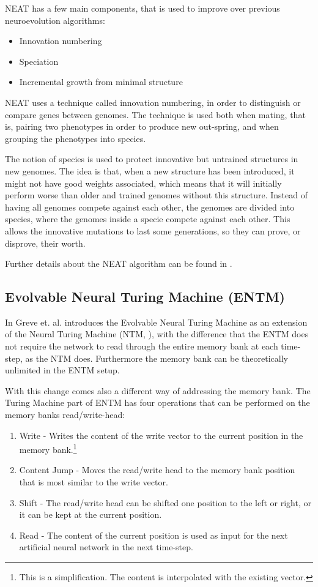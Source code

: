 \newpar NEAT has a few main components, that is used to improve over previous neuroevolution algorithms:

\begin{itemize}
	\item Innovation numbering
	\item Speciation
	\item Incremental growth from minimal structure
\end{itemize}

\newpar NEAT uses a technique called innovation numbering, in order to distinguish or compare genes between genomes. The technique is used both when mating, that is, pairing two phenotypes in order to produce new out-spring, and when grouping the phenotypes into species.

\newpar The notion of species is used to protect innovative but untrained structures in new genomes. The idea is that, when a new structure has been introduced, it might not have good weights associated, which means that it will initially perform worse than older and trained genomes without this structure. Instead of having all genomes compete against each other, the genomes are divided into species, where the genomes inside a specie compete against each other. This allows the innovative mutations to last some generations, so they can prove, or disprove, their worth.

\newpar Further details about the NEAT algorithm can be found in \cite{stanley2002evolving}.

\subsection{Evolvable Neural Turing Machine (ENTM)}
In \cite{greve2016evolving} Greve et. al. introduces the Evolvable Neural Turing Machine as an extension of the Neural Turing Machine (NTM, \cite{graves2014neural}), with the difference that the ENTM does not require the network to read through the entire memory bank at each time-step, as the NTM does. Furthermore the memory bank can be theoretically unlimited in the ENTM setup.

\newpar With this change comes also a different way of addressing the memory bank. The Turing Machine part of ENTM has four operations that can be performed on the memory banks read/write-head:

\begin{enumerate}
	\item Write - Writes the content of the write vector to the current position in the memory bank.\footnote{This is a simplification. The content is interpolated with the existing vector.}
	\item Content Jump - Moves the read/write head to the memory bank position that is most similar to the write vector.
	\item Shift - The read/write head can be shifted one position to the left or right, or it can be kept at the current position.
	\item Read - The content of the current position is used as input for the next artificial neural network in the next time-step.
\end{enumerate}

